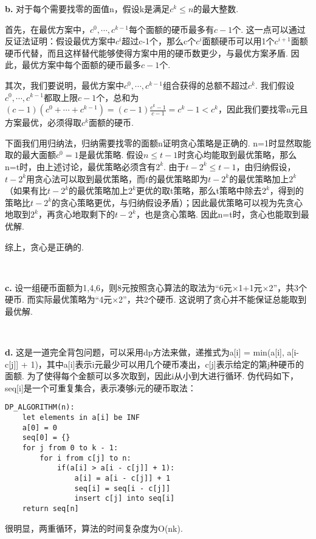 \documentclass[UTF8]{ctexart}
\begin{document}
\textbf{b.} 对于每个需要找零的面值n，假设k是满足$c^k\leq n$的最大整数. \par 首先，在最优方案中，$c^0,\cdots,c^{k-1}$每个面额的硬币最多有$c-1$个. 这一点可以通过反证法证明：假设最优方案中$c^i$超过c-1个，那么c个$c^i$面额硬币可以用1个$c^{i+1}$面额硬币代替，而且这样替代能够使得方案中用的硬币数更少，与最优方案矛盾. 因此，最优方案中每个面额的硬币最多$c-1$个.\par
其次，我们要说明，最优方案中$c^0,\cdots,c^{k-1}$组合获得的总额不超过$c^k$. 我们假设$c^0,\cdots,c^{k-1}$都取上限$c-1$个，总和为$(c-1)(c^0+\cdots+c^{k-1})=(c-1)\frac{c^k-1}{c-1}=c^k-1<c^k$，因此我们要找零n元且方案最优，必须得取$c^k$面额的硬币.\par
下面我们用归纳法，归纳需要找零的面额n证明贪心策略是正确的. n=1时显然取能取的最大面额$c^0=1$是最优策略. 假设$n\leq t-1$时贪心均能取到最优策略，那么n=t时，由上述讨论，最优策略必须含有$2^k$. 由于$t-2^k\leq t-1$，由归纳假设，$t-2^k$用贪心法可以取到最优策略，而$t$的最优策略即为$t-2^k$的最优策略加上$2^k$（如果有比$t-2^k$的最优策略加上$2^k$更优的取t策略，那么t策略中除去$2^k$，得到的策略比$t-2^k$的贪心策略更优，与归纳假设矛盾）；因此最优策略可以视为先贪心地取到$2^k$，再贪心地取剩下的$t-2^k$，也是贪心策略. 因此n=t时，贪心也能取到最优解. \par
综上，贪心是正确的.\par\ \ \par 

\textbf{c.} 设一组硬币面额为1,4,6，则8元按照贪心算法的取法为“6元$\times$1+1元$\times$2”，共3个硬币. 而实际最优策略为“4元$\times$2”，共2个硬币. 这说明了贪心并不能保证总能取到最优解.\par\ \ \par 

\textbf{d.} 这是一道完全背包问题，可以采用dp方法来做，递推式为a[i] = min(a[i], a[i-c[j]] + 1)，其中a[i]表示i元最少可以用几个硬币凑出，c[j]表示给定的第j种硬币的面额. 为了使得每个金额可以多次取到，因此i从小到大进行循环. 伪代码如下，seq[i]是一个可重复集合，表示凑够i元的硬币取法：
\begin{lstlisting}
DP_ALGORITHM(n):
    let elements in a[i] be INF
    a[0] = 0
    seq[0] = {}
    for j from 0 to k - 1:
        for i from c[j] to n:
            if(a[i] > a[i - c[j]] + 1):
                a[i] = a[i - c[j]] + 1
                seq[i] = seq[i - c[j]]
                insert c[j] into seq[i]
    return seq[n]
\end{lstlisting}
很明显，两重循环，算法的时间复杂度为O(nk).
\end{document}
